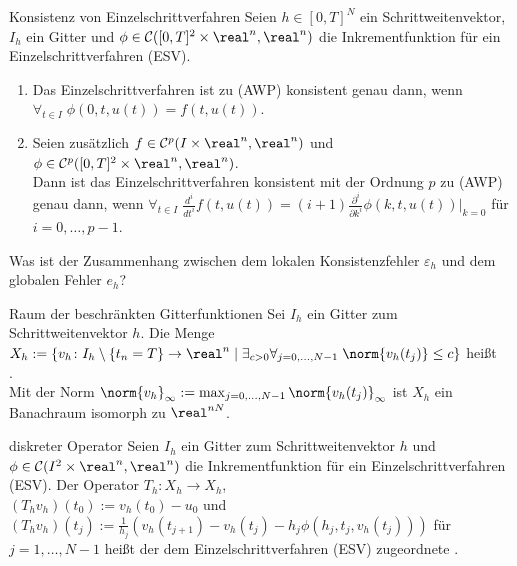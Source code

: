 \begin{Satz}{Konsistenz von Einzelschrittverfahren}
    Seien $h \in [0, T]^N$ ein Schrittweitenvektor,
    $I_h$ ein Gitter und $\phi \in \C([0, T]^2 \times \real^n, \real^n)$
    die Inkrementfunktion für ein Einzelschrittverfahren (ESV).
    \begin{enumerate}[label=(\emph{\roman*})]
        \item
        Das Einzelschrittverfahren ist zu (AWP) konsistent genau dann, wenn\\
        $\forall_{t \in I}\; \phi(0, t, u(t)) = f(t, u(t))$.
        
        \item
        Seien zusätzlich $f \in \C^p(I \times \real^n, \real^n)$ und
        $\phi \in \C^p([0, T]^2 \times \real^n, \real^n)$.\\
        Dann ist das Einzelschrittverfahren konsistent mit der Ordnung $p$
        zu (AWP) genau dann, wenn
        $\forall_{t \in I}\; \frac{d^i}{dt^i} f(t, u(t))
        = (i + 1) \frac{\partial^i}{\partial k^i} \phi(k, t, u(t))|_{k=0}$
        für $i = 0, \dotsc, p - 1$.
    \end{enumerate}
\end{Satz}

\linie

\begin{Bem}
    Was ist der Zusammenhang zwischen dem lokalen Konsistenzfehler
    $\varepsilon_h$ und dem globalen Fehler $e_h$?
\end{Bem}

\begin{Def}{Raum der beschränkten Gitterfunktionen}
    Sei $I_h$ ein Gitter zum Schrittweitenvektor $h$.
    Die Menge $X_h := \{v_h\colon I_h \setminus \{t_n = T\} \rightarrow
    \real^n \;|\; \exists_{c > 0} \forall_{j = 0, \dotsc, N - 1}\;
    \norm{v_h(t_j)} \le c\}$ heißt\\
    .\\
    Mit der Norm $\norm{v_h}_\infty :=
    \max_{j = 0, \dotsc, N - 1} \norm{v_h(t_j)}_\infty$
    ist $X_h$ ein Banachraum isomorph zu $\real^{nN}$.
\end{Def}

\begin{Def}{diskreter Operator}
    Seien $I_h$ ein Gitter zum Schrittweitenvektor $h$
    und $\phi \in \C(I^2 \times \real^n, \real^n)$
    die Inkrementfunktion für ein Einzelschrittverfahren (ESV).
    Der Operator $T_h\colon X_h \rightarrow X_h$,\\
    $(T_h v_h)(t_0) := v_h(t_0) - u_0$ und
    $(T_h v_h)(t_j) := \frac{1}{h_j} (v_h(t_{j+1}) - v_h(t_j) -
    h_j \phi(h_j, t_j, v_h(t_j)))$ für\\
    $j = 1, \dotsc, N - 1$
    heißt der dem Einzelschrittverfahren (ESV)
    zugeordnete .
\end{Def}

